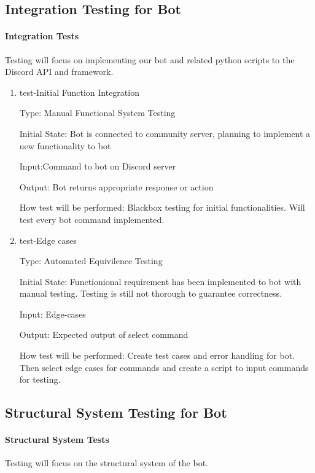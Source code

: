 \documentclass[12pt, titlepage]{article}
\begin{document}
\subsection{Integration Testing for Bot}
		
\paragraph{Integration Tests}
Testing will focus on implementing our bot and related python scripts to the Discord API and framework.

\begin{enumerate}

\item{test-Initial Function Integration\\}

Type: Manual Functional System Testing
					
Initial State: Bot is connected to community server, planning to implement a new functionality to bot
					
Input:Command to bot on Discord server
					
Output: Bot returns appropriate response or action
					
How test will be performed: Blackbox testing for initial functionalities. Will test every bot command implemented.
					
\item{test-Edge cases\\}

Type: Automated Equivilence Testing
					
Initial State: Functionional requirement has been implemented to bot with manual testing. Testing is still not thorough to guarantee correctness.
					
Input: Edge-cases
					
Output: Expected output of select command
					
How test will be performed:  Create test cases and error handling for bot. Then select edge cases for commands and create a script to input commands for testing.

\end{enumerate}

\subsection{Structural System Testing for Bot}
		
\paragraph{Structural System Tests}
Testing will focus on the structural system of the bot.
\end{document}
